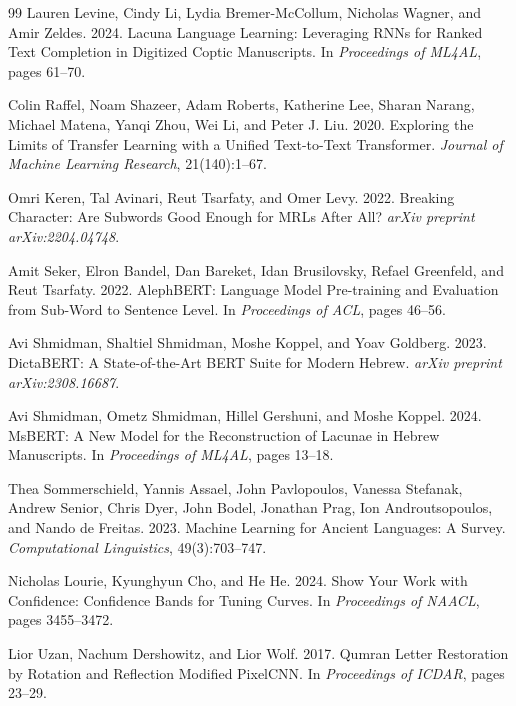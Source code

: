 \documentclass[10pt,twocolumn,a4paper]{article}
\begin{document}
\begin{thebibliography}{99}
Lauren Levine, Cindy Li, Lydia Bremer-McCollum, Nicholas Wagner, and Amir Zeldes. 2024.
Lacuna Language Learning: Leveraging RNNs for Ranked Text Completion in Digitized Coptic Manuscripts.
In \textit{Proceedings of ML4AL}, pages 61--70.

Colin Raffel, Noam Shazeer, Adam Roberts, Katherine Lee, Sharan Narang,
Michael Matena, Yanqi Zhou, Wei Li, and Peter J. Liu. 2020.
Exploring the Limits of Transfer Learning with a Unified Text-to-Text Transformer.
\textit{Journal of Machine Learning Research}, 21(140):1--67.

Omri Keren, Tal Avinari, Reut Tsarfaty, and Omer Levy. 2022.
Breaking Character: Are Subwords Good Enough for MRLs After All?
\textit{arXiv preprint arXiv:2204.04748}.

Amit Seker, Elron Bandel, Dan Bareket, Idan Brusilovsky, Refael Greenfeld,
and Reut Tsarfaty. 2022.
AlephBERT: Language Model Pre-training and Evaluation from Sub-Word to Sentence Level.
In \textit{Proceedings of ACL}, pages 46--56.

Avi Shmidman, Shaltiel Shmidman, Moshe Koppel, and Yoav Goldberg. 2023.
DictaBERT: A State-of-the-Art BERT Suite for Modern Hebrew.
\textit{arXiv preprint arXiv:2308.16687}.

Avi Shmidman, Ometz Shmidman, Hillel Gershuni, and Moshe Koppel. 2024.
MsBERT: A New Model for the Reconstruction of Lacunae in Hebrew Manuscripts.
In \textit{Proceedings of ML4AL}, pages 13--18.

Thea Sommerschield, Yannis Assael, John Pavlopoulos, Vanessa Stefanak,
Andrew Senior, Chris Dyer, John Bodel, Jonathan Prag, Ion Androutsopoulos,
and Nando de Freitas. 2023.
Machine Learning for Ancient Languages: A Survey.
\textit{Computational Linguistics}, 49(3):703--747.

Nicholas Lourie, Kyunghyun Cho, and He He. 2024.
Show Your Work with Confidence: Confidence Bands for Tuning Curves.
In \textit{Proceedings of NAACL}, pages 3455--3472.

Lior Uzan, Nachum Dershowitz, and Lior Wolf. 2017.
Qumran Letter Restoration by Rotation and Reflection Modified PixelCNN.
In \textit{Proceedings of ICDAR}, pages 23--29.

\end{thebibliography}
\endgroup
\end{document}
